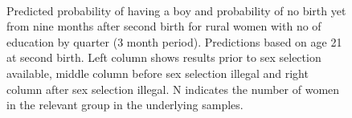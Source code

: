 \documentclass[12pt,letterpaper]{article}
\begin{document}
\begin{figure}[htpb]
{\begin{minipage}{0.31\textwidth}
        \captionsetup[subfigure]{labelformat=empty,position=top,captionskip=-1pt,farskip=-0.5pt}
        \\
        \captionsetup[subfigure]{labelformat=parens}
    \end{minipage}
}
\setcounter{subfigure}{3}
\caption{Predicted probability of having a boy and probability of
no birth yet from nine months after second birth for rural
women with no of education by quarter (3 month period). 
Predictions based on age 21 at second birth.
Left column shows results prior to sex selection available, middle column before
sex selection illegal and right column after sex selection illegal.
N indicates the number of women in the relevant group in the underlying samples.
}
\label{fig:results_spell3_low_rural}
\end{figure}
\end{document}
